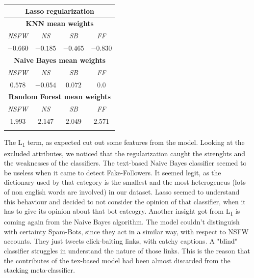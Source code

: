 \begin{center}
	\begin{tabular}{@{}cccc@{}}
		\multicolumn{4}{c}{Lasso regularization}\\
		\hline\hline
		\multicolumn{4}{c}{\textbf{KNN mean weights}}\\
		\hline
		\multicolumn{1}{c|}{\textit{NSFW}}&
		\multicolumn{1}{c|}{\textit{NS}}&
		\multicolumn{1}{c|}{\textit{SB}}&
		\multicolumn{1}{c}{\textit{FF}}\\
		\hline
		\multicolumn{1}{c|}{$ -0.660 $}&
		\multicolumn{1}{c|}{$ -0.185 $}&
		\multicolumn{1}{c|}{$ -0.465 $}&
		\multicolumn{1}{c}{$ -0.830 $}\\
		\hline
		\multicolumn{4}{c}{\textbf{Naive Bayes mean weights}}\\
		\hline
		\multicolumn{1}{c|}{\textit{NSFW}}&
		\multicolumn{1}{c|}{\textit{NS}}&
		\multicolumn{1}{c|}{\textit{SB}}&
		\multicolumn{1}{c}{\textit{FF}}\\
		\hline
		\multicolumn{1}{c|}{$ 0.578 $}&
		\multicolumn{1}{c|}{$ -0.054 $}&
		\multicolumn{1}{c|}{$ 0.072 $}&
		\multicolumn{1}{c}{$ 0.0 $}\\
		\hline
		\multicolumn{4}{c}{\textbf{Random Forest mean weights}}\\
		\hline
		\multicolumn{1}{c|}{\textit{NSFW}}&
		\multicolumn{1}{c|}{\textit{NS}}&
		\multicolumn{1}{c|}{\textit{SB}}&
		\multicolumn{1}{c}{\textit{FF}}\\
		\hline
		\multicolumn{1}{c|}{$ 1.993 $}&
		\multicolumn{1}{c|}{$ 2.147 $}&
		\multicolumn{1}{c|}{$ 2.049 $}&
		\multicolumn{1}{c}{$ 2.571 $}\\
		\hline\hline\\
	\end{tabular}
\end{center}
The L\textsubscript{1} term, as expected cut out some features from the model.
Looking at the excluded attributes, we noticed that the regularization caught the strenghts and the weaknesses of the classifiers. The text-based Naive Bayes classifier seemed to be useless when it came to detect Fake-Followers. It seemed legit, as the dictionary used by that category is the smallest and the most heterogeneus (lots of non english words are involved) in our dataset.
Lasso seemed to understand this behaviour and decided to not consider the opinion of that classifier, when it has to give its opinion about that bot cateogry.
Another insight got from L\textsubscript{1} is coming again from the Naive Bayes algorithm. The model couldn't distinguish with certainty Spam-Bots, since they act in a similar way, with respect to NSFW accounts. They just tweets click-baiting links, with catchy captions. A "blind" classifier struggles in understand the nature of those links. This is the reason that the contributes of the tex-based model had been almost discarded from the stacking meta-classifier.

